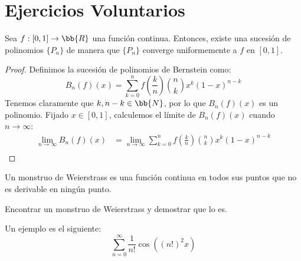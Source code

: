 \chapter{Ejercicios Voluntarios}

\begin{teo}
    Sea $f:[0,1]\to \bb{R}$ una función continua. Entonces, existe una sucesión de polinomios $\{P_n\}$ de manera que $\{P_n\}$ converge uniformemente a $f$ en $[0,1]$.
\end{teo}
\begin{proof}
    Definimos la sucesión de polinomios de Bernstein como:
    \begin{equation*}
        B_n(f)(x) = \sum_{k=0}^n f\left(\frac{k}{n}\right)\binom{n}{k} x^k(1-x)^{n-k}
    \end{equation*}
    Tenemos claramente que $k, n-k\in \bb{N}$, por lo que $B_n(f)(x)$ es un polinomio. Fijado $x\in [0,1]$, calculemos el límite de $B_n(f)(x)$ cuando $n\to \infty$:
    \begin{align*}
        \lim_{n\to \infty} B_n(f)(x) &= \lim_{n\to \infty} \sum_{k=0}^n f\left(\frac{k}{n}\right)\binom{n}{k} x^k(1-x)^{n-k} \\
    \end{align*}
\end{proof}

\begin{definicion}
    Un monstruo de Weierstrass es una función continua en todos sus puntos que no es derivable en ningún punto.
\end{definicion}

\begin{ejercicio*}
    Encontrar un monstruo de Weierstrass y demostrar que lo es.

    Un ejemplo es el siguiente:
    \begin{equation*}
        \sum_{n=0}^\infty \frac{1}{n!}\cos\left((n!)^2 x\right)
    \end{equation*}
\end{ejercicio*}